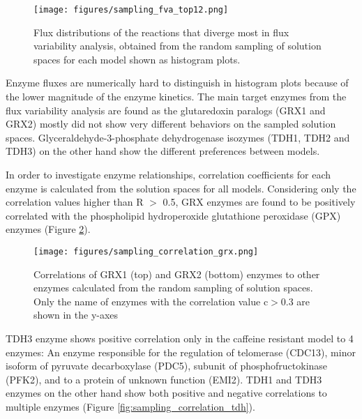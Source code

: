 \begin{figure}[H]
  \begin{center}
  \texttt{[image: figures/sampling\_fva\_top12.png]}
  \caption[Flux distributions of the reactions that diverge  most in flux variability analysis, obtained from the random sampling of solution spaces for each model shown as histogram plots]{Flux distributions of the reactions that diverge most in flux variability analysis, obtained from the random sampling of solution spaces for each model shown as histogram plots.}
  \label{fig:sampling_fva_top12}
  \end{center}
\end{figure}

Enzyme fluxes are numerically hard to distinguish in histogram plots because of the lower magnitude of the enzyme kinetics. The main target enzymes from the flux variability analysis are found as the glutaredoxin paralogs (GRX1 and GRX2) mostly did not show very different behaviors on the sampled solution spaces. Glyceraldehyde-3-phosphate dehydrogenase isozymes (TDH1, TDH2 and TDH3) on the other hand show the different preferences between models.

In order to investigate enzyme relationships, correlation coefficients for each enzyme is calculated from the solution spaces for all models. Considering only the correlation values higher than R $>$ 0.5, GRX enzymes are found to be positively correlated with the phospholipid hydroperoxide glutathione peroxidase (GPX) enzymes (Figure \ref{fig:sampling_correlation_grx}).

\begin{figure}[H]
  \begin{center}
  \texttt{[image: figures/sampling\_correlation\_grx.png]}
  \caption[Correlations of GRX1 (top) and GRX2 (bottom) enzymes to other enzymes calculated from the random sampling of solution spaces. Only the name of enzymes with the correlation value c$>$0.8 are shown in the y-axes]{Correlations of GRX1 (top) and GRX2 (bottom) enzymes to other enzymes calculated from the random sampling of solution spaces. Only the name of enzymes with the correlation value c$>$0.3 are shown in the y-axes}
  \label{fig:sampling_correlation_grx}
  \end{center}
\end{figure}

TDH3 enzyme shows positive correlation only in the caffeine resistant model to 4 enzymes: An enzyme responsible for the regulation of telomerase (CDC13), minor isoform of pyruvate decarboxylase (PDC5), subunit of phosphofructokinase (PFK2), and to a protein of unknown function (EMI2). TDH1 and TDH3 enzymes on the other hand show both positive and negative correlations to multiple enzymes (Figure \ref{fig:sampling_correlation_tdh}).

